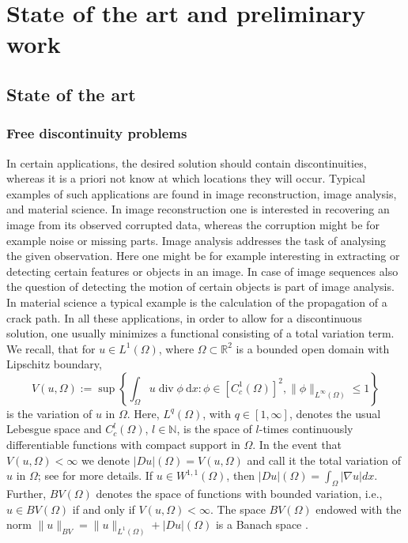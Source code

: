 \documentclass[enabledeprecatedfontcommands,cleardoublepage=empty,headsepline,twoside,11pt,DIV=15,BCOR=12mm,final]{scrartcl}
\newcommand{\N}{{\mathbb N}}
\newcommand{\R}{{\mathbb R}}
\begin{document}

\section{State of the art and preliminary work}
\label{sec:state-prelim}

\subsection{State of the art}
\label{sec:state} 

\subsubsection{Free discontinuity problems}

In certain applications, the desired solution should contain discontinuities, whereas it is a priori not know at which locations they will occur. Typical examples of such applications are found in image reconstruction, image analysis, and material science. In image reconstruction one is interested in recovering an image from its observed corrupted data, whereas the corruption might be for example noise or missing parts. Image analysis addresses the task of analysing the given observation. Here one might be for example interesting in extracting or detecting certain features or objects in an image. In case of image sequences also the question of detecting the motion of certain objects is part of image analysis. In material science a typical example is the calculation of the propagation of a crack path. In all these applications, in order to allow for a discontinuous solution, one usually minimizes a functional consisting of a total variation term. We recall, that for $u\in L^1(\Omega)$, where $\Omega \subset \R^2$ is a bounded open domain with Lipschitz boundary,
$$
V(u,\Omega):=\sup\left\{\int_{\Omega} u \operatorname{div} \phi \ \text{d}x : \phi \in [C_c^1(\Omega)]^2, \|{\phi}\|_{L^\infty(\Omega)} \leq 1\right\}
$$
is the variation of $u$ in $\Omega$. Here, $L^q(\Omega)$, with $q\in [1,\infty]$, denotes the usual Lebesgue space \cite{AdaFou} and $C_c^l(\Omega)$, $l\in \N$, is the space of $l$-times continuously differentiable functions with compact support in $\Omega$. In the event that $V(u,\Omega)<\infty$ we denote $|Du|(\Omega)=V(u,\Omega)$ and call it the total variation of $u$ in $\Omega$; see \cite{AmbFusPal, Giu} for more details. If $u\in W^{1,1}(\Omega)$, then $|Du|(\Omega)= \int_{\Omega}|\nabla u| dx$. Further, $BV(\Omega)$ denotes the space of functions with bounded variation, i.e., $u\in BV(\Omega)$ if and only if $V(u,\Omega)<\infty$. The space $BV(\Omega)$ endowed with the norm $\|u\|_{BV} = \|u\|_{L^1(\Omega)} + |Du|(\Omega)$ is a Banach space \cite{Giu}. 
\end{document}
